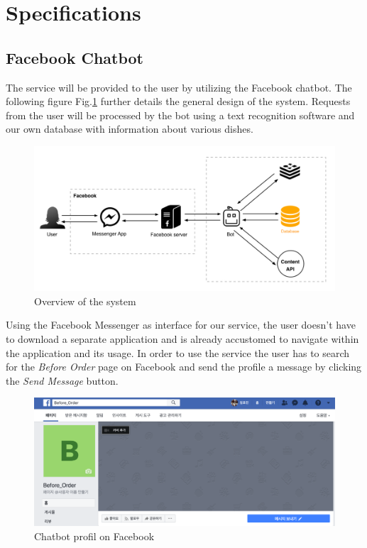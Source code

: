 \section{Specifications}
\subsection{Facebook Chatbot}
The service will be provided to the user by utilizing the Facebook chatbot. The following figure Fig.\ref{fig:facebook_overview} further details the general design of the system. Requests from the user will be processed by the bot using a text recognition software and our own database with information about various dishes.

\begin{figure}[htbp]
\centerline{\includegraphics[width=\linewidth]{./pictures/facebook_overview}}
\caption{Overview of the system}
\label{fig:facebook_overview}
\end{figure}
\FloatBarrier

Using the Facebook Messenger as interface for our service, the user doesn't have to download a separate application and is already accustomed to navigate within the application and its usage. In order to use the service the user has to search for the \emph{Before Order} page on Facebook and send the profile a message by clicking the \emph{Send Message} button.

\begin{figure}[htbp]
\centerline{\includegraphics[width=\linewidth]{./pictures/facebook_profil}}
\caption{Chatbot profil on Facebook}
\label{fig:facebook_profil}
\end{figure}
\FloatBarrier

